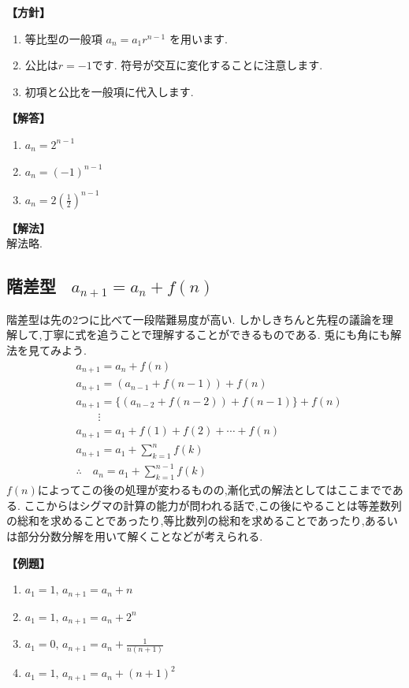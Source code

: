 \documentclass[dvipdfmx,a4paper,11pt,fleqn,openany]{jsbook}
\begin{document}
      \noindent\textbf{【方針】}
      \begin{enumerate}[label=(\arabic*),parsep=3pt]
        \item 等比型の一般項
              $\displaystyle a_n=a_1r^{n-1}$
              を用います.
        \item 公比は$r=-1$です.
              符号が交互に変化することに注意します.
        \item 初項と公比を一般項に代入します.
      \end{enumerate}

      \noindent\textbf{【解答】}
      \begin{enumerate}[label=(\arabic*),parsep=3pt]
        \item $\displaystyle a_n=2^{n-1}$
        \item $\displaystyle a_n=(-1)^{n-1}$
        \item $\displaystyle a_n=2\left(\frac12\right)^{n-1}$
      \end{enumerate}

      \noindent\textbf{【解法】}\\
      解法略.

    \subsection{階差型 \, $a_{n+1}=a_n+f(n)$}
      階差型は先の2つに比べて一段階難易度が高い.
      しかしきちんと先程の議論を理解して,丁寧に式を追うことで理解することができるものである.
      兎にも角にも解法を見てみよう.
      \begin{align*}
        &a_{n+1}=a_n+f(n)\\
        &a_{n+1}=(a_{n-1}+f(n-1))+f(n)\\
        &a_{n+1}=\{(a_{n-2}+f(n-2))+f(n-1)\}+f(n)\\
        &\qquad \vdots\\
        &a_{n+1}=a_1+f(1)+f(2)+\cdots+f(n)\\
        &a_{n+1}=a_1+\sum_{k=1}^{n} f(k)\\
        &\therefore \quad a_n=a_1+\sum_{k=1}^{n-1} f(k)
      \end{align*}
      $f(n)$によってこの後の処理が変わるものの,漸化式の解法としてはここまでである.
      ここからはシグマの計算の能力が問われる話で,この後にやることは等差数列の総和を求めることであったり,等比数列の総和を求めることであったり,あるいは部分分数分解を用いて解くことなどが考えられる.

      \noindent \textbf{【例題】}
      \begin{enumerate}[label=(\arabic*),parsep=3pt]
        \item $\displaystyle a_1=1,\, a_{n+1}=a_n+n$
        \item $\displaystyle a_1=1,\, a_{n+1}=a_n+2^n$
        \item $\displaystyle a_1=0,\, a_{n+1}=a_n+\frac{1}{n(n+1)}$
        \item $\displaystyle a_1=1,\, a_{n+1}=a_n+(n+1)^2$
      \end{enumerate}
\end{document}
